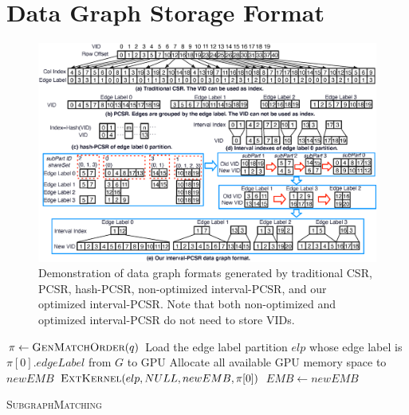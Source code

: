 \section{Data Graph Storage Format}
\begin{figure}
\centering
\includegraphics[width=\textwidth]{./figure/graphformat.eps}
\caption{Demonstration of data graph formats generated by traditional CSR, PCSR, hash-PCSR, non-optimized interval-PCSR, and our optimized interval-PCSR. Note that both non-optimized and optimized interval-PCSR do not need to store VIDs.}	
\label{fig:dataformat}
\end{figure}

\begin{algorithm}[t!]
  $\pi \leftarrow \textsc{GenMatchOrder}(q)$\;
Load the edge label partition $elp$ whose edge label is $\pi[0].edgeLabel$ from $G$ to GPU\; Allocate all available GPU memory space to
$newEMB$\; $\textsc{ExtKernel}(elp,NULL,newEMB,\pi[0])$\; $EMB \leftarrow newEMB$\;  \caption{\textsc{SubgraphMatching}} \label{algo:submatch}
\end{algorithm}


